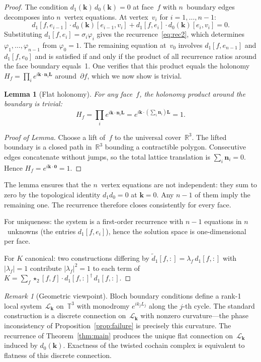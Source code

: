 \documentclass[11pt]{article}
\newtheorem{lemma}[theorem]{Lemma}
\theoremstyle{remark}
\newtheorem{remark}[theorem]{Remark}
\newcommand{\bk}{\mathbf{k}}
\newcommand{\bL}{\mathbf{L}}
\newcommand{\bn}{\mathbf{n}}
\newcommand{\RR}{\mathbb{R}}
\newcommand{\TT}{\mathbb{T}}
\begin{document}
\begin{proof}
The condition $d_1(\bk)\,d_0(\bk) = 0$ at face~$f$ with $n$~boundary
edges decomposes into $n$~vertex equations. At vertex~$v_i$ for
$i = 1, \ldots, n{-}1$:
\begin{equation}\label{eq:vertex}
d_1[f,e_{i-1}]\cdot d_0(\bk)[e_{i-1},v_i]
+ d_1[f,e_i]\cdot d_0(\bk)[e_i,v_i] = 0.
\end{equation}
Substituting $d_1[f,e_i] = \sigma_i\varphi_i$
gives the recurrence~\eqref{eq:rec2}, which determines
$\varphi_1, \ldots, \varphi_{n-1}$ from $\varphi_0 = 1$. The remaining
equation at~$v_0$ involves $d_1[f,e_{n-1}]$ and $d_1[f,e_0]$ and is
satisfied if and only if the product of all recurrence ratios around the
face boundary equals~1. One verifies that this product equals the
holonomy $H_f = \prod_i e^{i\bk\cdot\bn_i\bL}$ around~$\partial f$,
which we now show is trivial.

\begin{lemma}[Flat holonomy]\label{lem:holonomy}
For any face~$f$, the holonomy product around the boundary is trivial:
\[
H_f = \prod_i e^{i\bk\cdot\bn_i\bL}
= e^{i\bk\cdot(\sum_i \bn_i)\bL} = 1.
\]
\end{lemma}

\begin{proof}[Proof of Lemma]
Choose a lift of~$f$ to the universal cover~$\RR^3$. The lifted boundary
is a closed path in~$\RR^3$ bounding a contractible polygon. Consecutive
edges concatenate without jumps, so the total lattice translation is
$\sum_i \bn_i = 0$. Hence $H_f = e^{i\bk\cdot\mathbf{0}} = 1$.
\end{proof}

The lemma ensures that the $n$~vertex equations are not independent: they
sum to zero by the topological identity $d_1 d_0 = 0$ at $\bk = 0$. Any
$n{-}1$ of them imply the remaining one. The recurrence therefore closes
consistently for every face.

For uniqueness: the system is a first-order recurrence with $n{-}1$
equations in $n$~unknowns (the entries $d_1[f,e_i]$), hence the solution
space is one-dimensional per face.

For $K$ canonical: two constructions differing by
$\tilde{d}_1[f,:] = \lambda_f\,d_1[f,:]$ with $|\lambda_f| = 1$
contribute $|\lambda_f|^2 = 1$ to each term of
$K = \sum_f \star_2[f,f]\cdot d_1[f,:]^\dagger\,d_1[f,:]$.
\end{proof}

\begin{remark}[Geometric viewpoint]\label{rem:flat}
Bloch boundary conditions define a rank-1 local system~$\mathcal{L}_\bk$
on~$\TT^3$ with monodromy $e^{ik_j L_j}$ along the $j$-th cycle. The
standard construction is a discrete connection on~$\mathcal{L}_\bk$ with
nonzero curvature---the phase inconsistency of
Proposition~\ref{prop:failure} is precisely this curvature. The
recurrence of Theorem~\ref{thm:main} produces the unique flat connection
on~$\mathcal{L}_\bk$ induced by $d_0(\bk)$. Exactness of the twisted
cochain complex is equivalent to flatness of this discrete connection.
\end{remark}
\end{document}
